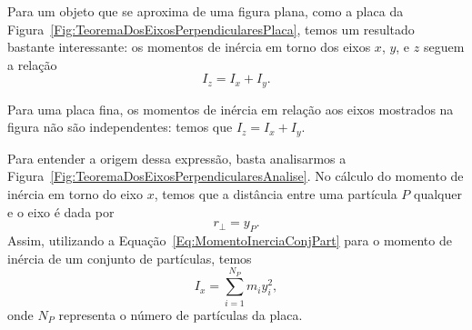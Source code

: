 
Para um objeto que se aproxima de uma figura plana, como a placa da Figura~\ref{Fig:TeoremaDosEixosPerpendicularesPlaca}, temos um resultado bastante interessante: os momentos de inércia em torno dos eixos $x$, $y$, e $z$ seguem a relação
\begin{equation}
    I_z = I_x + I_y.
\end{equation}

\begin{marginfigure}[2cm]
\centering
{}
\caption{Para uma placa fina, os momentos de inércia em relação aos eixos mostrados na figura não são independentes: temos que $I_z = I_x + I_y$. \label{Fig:TeoremaDosEixosPerpendicularesPlaca}}
\end{marginfigure}

Para entender a origem dessa expressão, basta analisarmos a Figura~\ref{Fig:TeoremaDosEixosPerpendicularesAnalise}. No cálculo do momento de inércia em torno do eixo $x$, temos que a distância entre uma partícula $P$ qualquer e o eixo é dada por
\begin{equation}
    r_\perp = y_P.
\end{equation}
%
Assim, utilizando a Equação~\eqref{Eq:MomentoInerciaConjPart} para o momento de inércia de um conjunto de partículas, temos
\begin{equation}
    I_x = \sum_{i = 1}^{N_P} m_i y_i^2,
\end{equation}
%
onde $N_P$ representa o número de partículas da placa.

